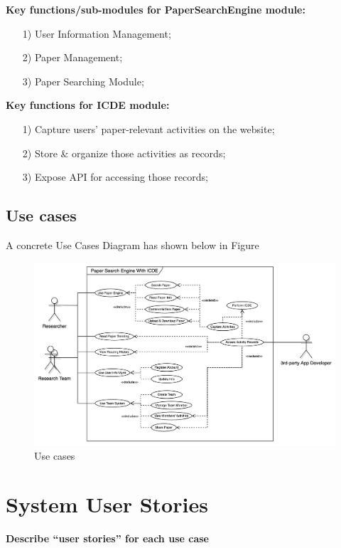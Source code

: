 \documentclass[sigconf, nonacm]{../tex_template/acmart}
\begin{document}
\textbf{Key functions/sub-modules for PaperSearchEngine module:}

\begin{itemize}
	\item [1)]
	      User Information Management;
	\item [2)]
	      Paper Management;
	\item [3)]
	      Paper Searching Module;
\end{itemize}

\textbf{Key functions for ICDE module:}

\begin{itemize}
	\item [1)]
	      Capture users’ paper-relevant activities on the website;
	\item [2)]
	      Store \& organize those activities as records;
	\item [3)]
	      Expose API for accessing those records;
\end{itemize}

\subsection{Use cases}

A concrete Use Cases Diagram has shown below in Figure 

\begin{figure}[htp]
	\centering
	\includegraphics[scale=0.13]{D1F2.png}
	\caption{Use cases}
	\label{fig:uc}
\end{figure}

\section{System User Stories}
\textbf{Describe “user stories” for each use case}
\end{document}
